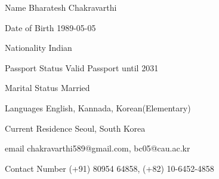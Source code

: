 

\begin{cvskills}

  \cvskill
    {Name} %
    {Bharatesh Chakravarthi} %
    
  \cvskill
    {Date of Birth} %
    {1989-05-05} %

  \cvskill
    {Nationality} %
    {Indian} %

  \cvskill
    {Passport Status} %
    {Valid Passport until 2031 } %

    
  \cvskill
    {Marital Status} %
    {Married} %


  \cvskill
    {Languages} %
    {English, Kannada, Korean(Elementary)} %

  \cvskill
    {Current Residence} %
    {Seoul, South Korea} %

  \cvskill
    {email} %
    {chakravarthi589@gmail.com, bc05@cau.ac.kr} %
    

  \cvskill
    {Contact Number} %
    {(+91) 80954 64858, (+82) 10-6452-4858} %
\end{cvskills}